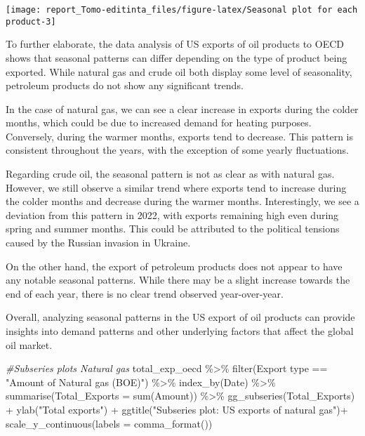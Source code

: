 \documentclass[
]{article}
\newenvironment{Shaded}{\begin{snugshade}}{\end{snugshade}}
\newcommand{\AttributeTok}[1]{\textcolor[rgb]{0.77,0.63,0.00}{#1}}
\newcommand{\CommentTok}[1]{\textcolor[rgb]{0.56,0.35,0.01}{\textit{#1}}}
\newcommand{\FunctionTok}[1]{\textcolor[rgb]{0.00,0.00,0.00}{#1}}
\newcommand{\NormalTok}[1]{#1}
\newcommand{\SpecialCharTok}[1]{\textcolor[rgb]{0.00,0.00,0.00}{#1}}
\newcommand{\StringTok}[1]{\textcolor[rgb]{0.31,0.60,0.02}{#1}}
\begin{document}
\begin{center}\texttt{[image: report\_Tomo-editinta\_files/figure-latex/Seasonal plot for each product-3]} \end{center}

To further elaborate, the data analysis of US exports of oil products to
OECD shows that seasonal patterns can differ depending on the type of
product being exported. While natural gas and crude oil both display
some level of seasonality, petroleum products do not show any
significant trends.

In the case of natural gas, we can see a clear increase in exports
during the colder months, which could be due to increased demand for
heating purposes. Conversely, during the warmer months, exports tend to
decrease. This pattern is consistent throughout the years, with the
exception of some yearly fluctuations.

Regarding crude oil, the seasonal pattern is not as clear as with
natural gas. However, we still observe a similar trend where exports
tend to increase during the colder months and decrease during the warmer
months. Interestingly, we see a deviation from this pattern in 2022,
with exports remaining high even during spring and summer months. This
could be attributed to the political tensions caused by the Russian
invasion in Ukraine.

On the other hand, the export of petroleum products does not appear to
have any notable seasonal patterns. While there may be a slight increase
towards the end of each year, there is no clear trend observed
year-over-year.

Overall, analyzing seasonal patterns in the US export of oil products
can provide insights into demand patterns and other underlying factors
that affect the global oil market.

\begin{Shaded}
\begin{Highlighting}[]
\CommentTok{\#Subseries plots Natural gas}
\NormalTok{total\_exp\_oecd }\SpecialCharTok{\%\textgreater{}\%} \FunctionTok{filter}\NormalTok{(}\StringTok{\textasciigrave{}}\AttributeTok{Export type}\StringTok{\textasciigrave{}} \SpecialCharTok{==} \StringTok{"Amount of Natural gas (BOE)"}\NormalTok{) }\SpecialCharTok{\%\textgreater{}\%} 
  \FunctionTok{index\_by}\NormalTok{(Date) }\SpecialCharTok{\%\textgreater{}\%} 
  \FunctionTok{summarise}\NormalTok{(}\AttributeTok{Total\_Exports =} \FunctionTok{sum}\NormalTok{(}\StringTok{\textasciigrave{}}\AttributeTok{Amount}\StringTok{\textasciigrave{}}\NormalTok{)) }\SpecialCharTok{\%\textgreater{}\%} 
  \FunctionTok{gg\_subseries}\NormalTok{(Total\_Exports) }\SpecialCharTok{+} 
  \FunctionTok{ylab}\NormalTok{(}\StringTok{"Total exports"}\NormalTok{) }\SpecialCharTok{+} 
  \FunctionTok{ggtitle}\NormalTok{(}\StringTok{"Subseries plot: US exports of natural gas"}\NormalTok{)}\SpecialCharTok{+}
  \FunctionTok{scale\_y\_continuous}\NormalTok{(}\AttributeTok{labels =} \FunctionTok{comma\_format}\NormalTok{())}
\end{Highlighting}
\end{Shaded}
\end{document}
